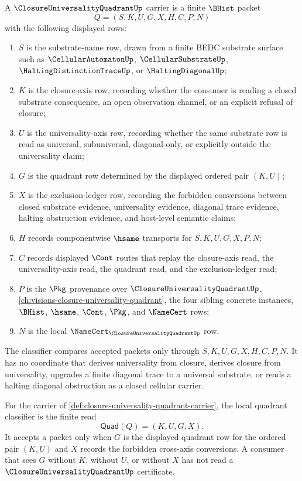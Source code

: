 \begin{definition}
\label{def:closure-universality-quadrant-carrier}
A $\ClosureUniversalityQuadrantUp$ carrier is a finite $\BHist$ packet
$$
Q=(S,K,U,G,X,H,C,P,N)
$$
with the following displayed rows:
\begin{enumerate}
\item $S$ is the substrate-name row, drawn from a finite BEDC substrate surface such as $\CellularAutomatonUp$, $\CellularSubstrateUp$, $\HaltingDistinctionTraceUp$, or $\HaltingDiagonalUp$;
\item $K$ is the closure-axis row, recording whether the consumer is reading a closed substrate consequence, an open observation channel, or an explicit refusal of closure;
\item $U$ is the universality-axis row, recording whether the same substrate row is read as universal, subuniversal, diagonal-only, or explicitly outside the universality claim;
\item $G$ is the quadrant row determined by the displayed ordered pair $(K,U)$;
\item $X$ is the exclusion-ledger row, recording the forbidden conversions between closed substrate evidence, universality evidence, diagonal trace evidence, halting obstruction evidence, and host-level semantic claims;
\item $H$ records componentwise $\hsame$ transports for $S,K,U,G,X,P,N$;
\item $C$ records displayed $\Cont$ routes that replay the closure-axis read, the universality-axis read, the quadrant read, and the exclusion-ledger read;
\item $P$ is the $\Pkg$ provenance over $\ClosureUniversalityQuadrantUp$, \autoref{ch:visions-closure-universality-quadrant}, the four sibling concrete instances, $\BHist$, $\hsame$, $\Cont$, $\Pkg$, and $\NameCert$ rows;
\item $N$ is the local $\NameCert_{\ClosureUniversalityQuadrantUp}$ row.
\end{enumerate}
The classifier compares accepted packets only through $S,K,U,G,X,H,C,P,N$. It has no coordinate that derives universality from closure, derives closure from universality, upgrades a finite diagonal trace to a universal substrate, or reads a halting diagonal obstruction as a closed cellular carrier.
\end{definition}

\begin{definition}
\label{def:closure-universality-quadrant-classifier}
For the carrier of \autoref{def:closure-universality-quadrant-carrier}, the local quadrant classifier is the finite read
$$
\mathsf{Quad}(Q)=(K,U,G,X).
$$
It accepts a packet only when $G$ is the displayed quadrant row for the ordered pair $(K,U)$ and $X$ records the forbidden cross-axis conversions. A consumer that sees $G$ without $K$, without $U$, or without $X$ has not read a $\ClosureUniversalityQuadrantUp$ certificate.
\end{definition}

